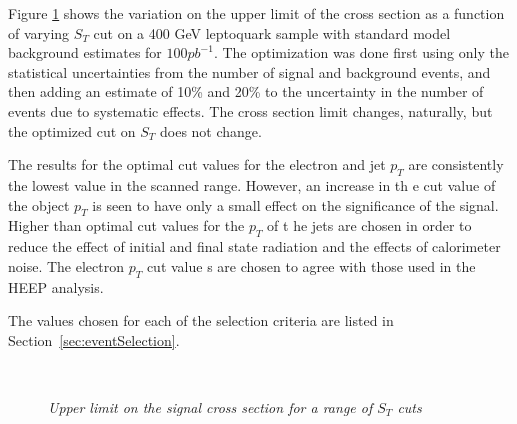 Figure \ref{fig:optimization} shows the variation on the upper limit of the cross section as a function of varying $S_T$ cut on a 400 GeV leptoquark sample with standard model background estimates for $100 pb^{-1}$.  The optimization was done first using only the statistical uncertainties from the number of signal and background events, and then adding an estimate of 10\% and 20\% to the uncertainty in the number of events due to systematic effects.  The cross section limit changes, naturally, but the optimized cut on $S_T$ does not change.

The results for the optimal cut values for the electron and jet $p_T$ are consistently the lowest value in the scanned range.  However, an increase in th
e cut value of the object $p_T$ is seen to have only a small effect on the significance of the signal.  Higher than optimal cut values for the $p_T$ of t
he jets are chosen in order to reduce the effect of initial and final state radiation and the effects of calorimeter noise.  The electron $p_T$ cut value
s are chosen to agree with those used in the HEEP analysis.

The values chosen for each of the selection criteria are listed in Section~\ref{sec:eventSelection}.

\begin{figure}[htbp]
  \begin{center}
       \\
    \caption{\small \sl Upper limit on the signal cross section for a range of $S_T$ cuts }
    \label{fig:optimization}
  \end{center}
\end{figure}




%
